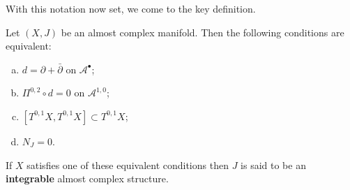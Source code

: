 \documentclass{amsart}
\begin{document}
With this notation now set, we come to the key definition.
\begin{proposition}
    Let $(X,J)$ be an almost complex manifold. Then the following conditions are equivalent:
    \begin{enumerate}[(a)]
        \item $d=\partial+\bar\partial$ on $\mathcal{A}^\bullet$;
        \item $\Pi^{0,2}\circ d=0$ on $\mathcal{A}^{1,0}$;
        \item $[T^{0,1}X,T^{0,1}X]\subset T^{0,1}X$;
        \item $N_J=0$.
    \end{enumerate}
    If $X$ satisfies one of these equivalent conditions then $J$ is said to be an
    \textbf{integrable} almost complex structure.
    \label{prop:integrable}
\end{proposition}
\end{document}
